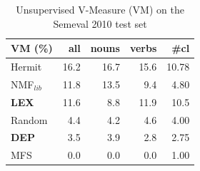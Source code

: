  
 
%    
%

\begin{table}[]
\centering

\begin{tabular}{@{}lrrrr@{}}
\toprule
\textbf{VM (\%)} & \textbf{all} & \textbf{nouns} & \textbf{verbs} & \textbf{\#cl} \\ \midrule
{Hermit} & 16.2 & 16.7 & 15.6 & 10.78 \\
NMF$_{lib}$&11.8&13.5&9.4&4.80\\
\textbf{LEX} & 11.6 & 8.8 & 11.9 & 10.5 \\
Random & 4.4 & 4.2 & 4.6 & 4.00 \\
\textbf{DEP} & 3.5 & 3.9 & 2.8 & 2.75 \\
MFS & 0.0 & 0.0 & 0.0 & 1.00 \\ \bottomrule
\end{tabular}
\caption{Unsupervised V-Measure (VM) on the Semeval 2010 test set}
\label{tab:sem2010_VM}
\end{table}


